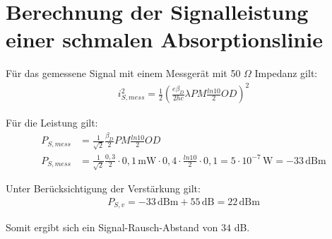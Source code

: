 
\section{Berechnung der Signalleistung einer schmalen Absorptionslinie}

Für das gemessene Signal mit einem Messgerät mit 50 $\Omega$ Impedanz gilt:
\begin{gather}
    i_{S,mess}^2 = \frac{1}{2}(\frac{e\beta_D}{2hc}\lambda P M \frac{ln10}{2}OD)^2
\end{gather}

Für die Leistung gilt:
\begin{align}
    P_{S,mess} &= \frac{1}{\sqrt{2}}\frac{\beta_D}{2} P M \frac{ln10}{2} OD\\
    P_{S,mess} &= \frac{1}{\sqrt{2}}\frac{0,3}{2} \cdot 0,1 \, \text{mW} \cdot 0,4 \cdot \frac{ln10}{2} \cdot 0,1 = 5 \cdot 10^{-7} \, \text{W} = -33 \, \text{dBm}
\end{align}

Unter Berücksichtigung der Verstärkung gilt:
\begin{gather}
    P_{S,v} = -33 \, \text{dBm} + 55 \, \text{dB} = 22 \, \text{dBm}
\end{gather}

Somit ergibt sich ein Signal-Rausch-Abstand von $34$ dB.